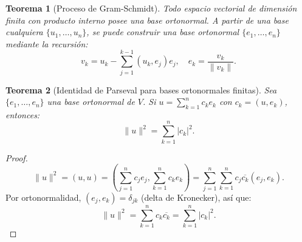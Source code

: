 \documentclass[a4paper,11pt]{report}
\newtheorem{theorem}{Teorema}[chapter]
\begin{document}
\begin{theorem}[Proceso de Gram-Schmidt]
Todo espacio vectorial de dimensión finita con producto interno posee una base ortonormal. A partir de una base cualquiera $\{u_1, \ldots, u_n\}$, se puede construir una base ortonormal $\{e_1, \ldots, e_n\}$ mediante la recursión:
\[ v_k = u_k - \sum_{j=1}^{k-1} (u_k, e_j) e_j, \quad e_k = \frac{v_k}{\|v_k\|}. \]
\end{theorem}

\begin{theorem}[Identidad de Parseval para bases ortonormales finitas]\label{thm:parseval_finito_appendix}
Sea $\{e_1, \ldots, e_n\}$ una base ortonormal de $V$. Si $u = \sum_{k=1}^n c_k e_k$ con $c_k = (u, e_k)$, entonces:
\begin{equation}\label{parseval_finito_appendix}
\|u\|^2 = \sum_{k=1}^n |c_k|^2.
\end{equation}
\end{theorem}

\begin{proof}
\[
\|u\|^2 = (u, u) = \left( \sum_{j=1}^n c_j e_j, \sum_{k=1}^n c_k e_k \right) = \sum_{j=1}^n \sum_{k=1}^n c_j \overline{c_k} (e_j, e_k).
\]
Por ortonormalidad, $(e_j, e_k) = \delta_{jk}$ (delta de Kronecker), así que:
\[
\|u\|^2 = \sum_{k=1}^n c_k \overline{c_k} = \sum_{k=1}^n |c_k|^2.
\]
\end{proof}
\end{document}
